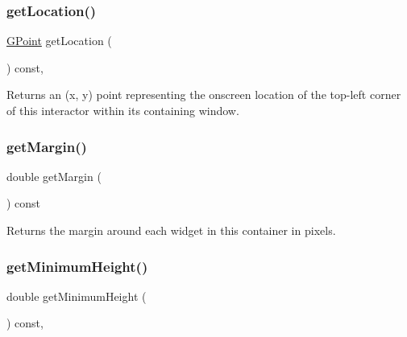 \subsubsection{\texorpdfstring{get\+Location()}{getLocation()}}
{\footnotesize\ttfamily \mbox{\hyperlink{structsgl_1_1GPoint}{G\+Point}} get\+Location (\begin{DoxyParamCaption}{ }\end{DoxyParamCaption}) const\hspace{0.3cm}{\ttfamily [virtual]}, {\ttfamily [inherited]}}



Returns an (x, y) point representing the onscreen location of the top-\/left corner of this interactor within its containing window. 

\mbox{\label{classsgl_1_1GContainer_ae2b63e249b9251e1893dae87aaf4cc3d}} 
\subsubsection{\texorpdfstring{get\+Margin()}{getMargin()}}
{\footnotesize\ttfamily double get\+Margin (\begin{DoxyParamCaption}{ }\end{DoxyParamCaption}) const\hspace{0.3cm}{\ttfamily [virtual]}}



Returns the margin around each widget in this container in pixels. 

\mbox{\label{classsgl_1_1GInteractor_aed4b0075fcc434499c3cb3e46896bda3}} 
\subsubsection{\texorpdfstring{get\+Minimum\+Height()}{getMinimumHeight()}}
{\footnotesize\ttfamily double get\+Minimum\+Height (\begin{DoxyParamCaption}{ }\end{DoxyParamCaption}) const\hspace{0.3cm}{\ttfamily [virtual]}, {\ttfamily [inherited]}}



